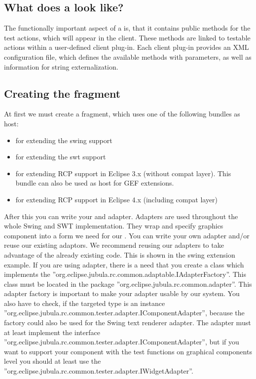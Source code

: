 \subsection{What does a \gdtesterclass look like?}

The functionally important aspect of a \gdtesterclass is, that it
contains public methods for the \app{} test actions, which will appear in
the client. These methods are linked to testable actions within a user-defined
\app{} client plug-in. Each \app{} client plug-in provides an XML configuration
file, which defines the available methods with parameters, as well as
information for string externalization.

\subsection{Creating the fragment}

At first we must create a fragment, which uses one of the following bundles as
host:

\begin{itemize}
  \item {} for extending the swing support
  \item {} for extending the swt support
  \item {} for extending RCP support in Eclipse 3.x (without compat layer).
        This bundle can also be used as host for GEF extensions.
  \item {} for extending RCP support in Eclipse 4.x (including compat layer)
\end{itemize}

After this you can write your \gdtesterclasses and adapter. Adapters are used
throughout the whole Swing and SWT implementation. They wrap and specify
graphics component into a form we need for our \gdtesterclasses. You can write
your own adapter and/or reuse our existing adaptors. We recommend reusing our
adapters to take advantage of the already existing code. This is shown in the
swing extension example. If you are using adapter, there is a need that you
create a class which implements the
''org.eclipse.jubula.rc.common.adaptable.IAdapterFactory''. This class must be
located in the package ''org.eclipse.jubula.rc.common.adapter''. This
adapter factory is important to make your adapter usable by our system. You
also have to check, if the targeted type is an instance
''org.eclipse.jubula.rc.common.tester.adapter.IComponentAdapter'', because
the factory could also be used for the Swing text renderer adapter.
The adapter must at least implement the interface
''org.eclipse.jubula.rc.common.tester.adapter.IComponentAdapter'', but if you
want to support your component with the test functions on graphical components
level you should at least use the
''org.eclipse.jubula.rc.common.tester.adapter.IWidgetAdapter''.

